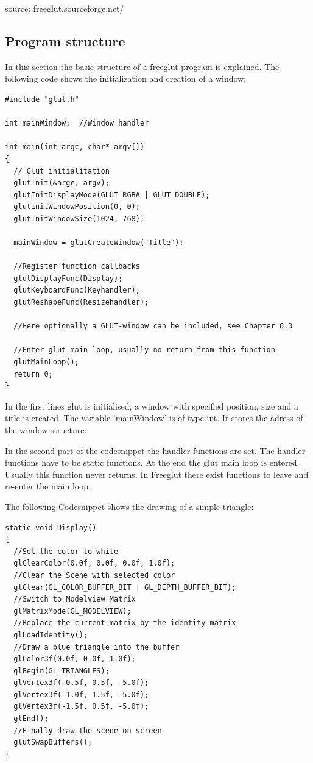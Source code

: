 \documentclass[10pt,a4paper,DIV=11]{scrreprt}
\begin{document}
source: freeglut.sourceforge.net/

\subsection{Program structure}
In this section the basic structure of a freeglut-program is explained.
The following code shows the initialization and creation of a window:

\begin{lstlisting}[caption={Initialization a GLUT-program},label=lst:glut-init]
#include "glut.h"

int mainWindow;  //Window handler

int main(int argc, char* argv[])
{
  // Glut initialitation
  glutInit(&argc, argv);
  glutInitDisplayMode(GLUT_RGBA | GLUT_DOUBLE);
  glutInitWindowPosition(0, 0); 
  glutInitWindowSize(1024, 768);
  
  mainWindow = glutCreateWindow("Title");
  
  //Register function callbacks
  glutDisplayFunc(Display);
  glutKeyboardFunc(Keyhandler);
  glutReshapeFunc(Resizehandler);
  
  //Here optionally a GLUI-window can be included, see Chapter 6.3
  
  //Enter glut main loop, usually no return from this function
  glutMainLoop(); 
  return 0;
}
\end{lstlisting}

In the first lines glut is initialised, a window with specified position, size and a title is created.
The variable 'mainWindow' is of type int. It stores the adress of the window-structure.

In the second part of the codesnippet the handler-functions are set. The handler functions have to be static functions.
At the end the glut main loop is entered. Usually this function never returns. In Freeglut there exist functions to leave and re-enter the main loop.

The following Codesnippet shows the drawing of a simple triangle:

\begin{lstlisting}[caption={Drawing some graphics},label=lst:glut-draw]
static void Display()
{
  //Set the color to white
  glClearColor(0.0f, 0.0f, 0.0f, 1.0f);
  //Clear the Scene with selected color
  glClear(GL_COLOR_BUFFER_BIT | GL_DEPTH_BUFFER_BIT);
  //Switch to Modelview Matrix
  glMatrixMode(GL_MODELVIEW);
  //Replace the current matrix by the identity matrix
  glLoadIdentity();
  //Draw a blue triangle into the buffer
  glColor3f(0.0f, 0.0f, 1.0f);
  glBegin(GL_TRIANGLES);
  glVertex3f(-0.5f, 0.5f, -5.0f);
  glVertex3f(-1.0f, 1.5f, -5.0f);
  glVertex3f(-1.5f, 0.5f, -5.0f);
  glEnd();
  //Finally draw the scene on screen
  glutSwapBuffers();
}
\end{lstlisting}
\end{document}
